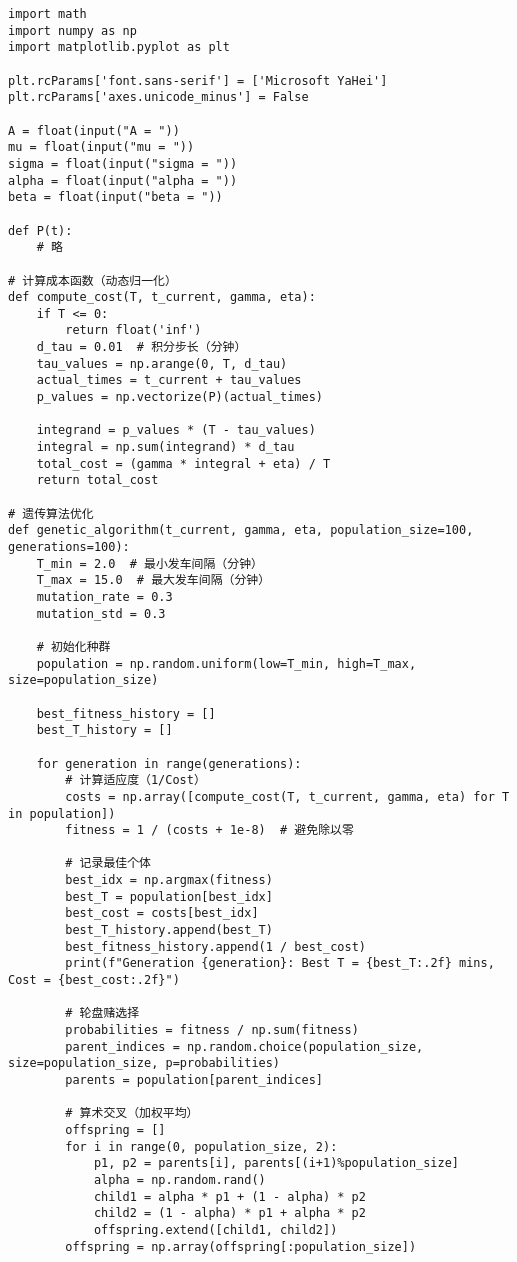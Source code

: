 \begin{lstlisting}[caption={遗传算法}]
import math
import numpy as np
import matplotlib.pyplot as plt

plt.rcParams['font.sans-serif'] = ['Microsoft YaHei']
plt.rcParams['axes.unicode_minus'] = False

A = float(input("A = "))
mu = float(input("mu = "))
sigma = float(input("sigma = "))
alpha = float(input("alpha = "))
beta = float(input("beta = "))

def P(t):
    # 略

# 计算成本函数（动态归一化）
def compute_cost(T, t_current, gamma, eta):
    if T <= 0:
        return float('inf')
    d_tau = 0.01  # 积分步长（分钟）
    tau_values = np.arange(0, T, d_tau)
    actual_times = t_current + tau_values
    p_values = np.vectorize(P)(actual_times)
    
    integrand = p_values * (T - tau_values)
    integral = np.sum(integrand) * d_tau
    total_cost = (gamma * integral + eta) / T
    return total_cost

# 遗传算法优化
def genetic_algorithm(t_current, gamma, eta, population_size=100, generations=100):
    T_min = 2.0  # 最小发车间隔（分钟）
    T_max = 15.0  # 最大发车间隔（分钟）
    mutation_rate = 0.3
    mutation_std = 0.3

    # 初始化种群
    population = np.random.uniform(low=T_min, high=T_max, size=population_size)

    best_fitness_history = []
    best_T_history = []

    for generation in range(generations):
        # 计算适应度（1/Cost）
        costs = np.array([compute_cost(T, t_current, gamma, eta) for T in population])
        fitness = 1 / (costs + 1e-8)  # 避免除以零
        
        # 记录最佳个体
        best_idx = np.argmax(fitness)
        best_T = population[best_idx]
        best_cost = costs[best_idx]
        best_T_history.append(best_T)
        best_fitness_history.append(1 / best_cost)
        print(f"Generation {generation}: Best T = {best_T:.2f} mins, Cost = {best_cost:.2f}")
        
        # 轮盘赌选择
        probabilities = fitness / np.sum(fitness)
        parent_indices = np.random.choice(population_size, size=population_size, p=probabilities)
        parents = population[parent_indices]
        
        # 算术交叉（加权平均）
        offspring = []
        for i in range(0, population_size, 2):
            p1, p2 = parents[i], parents[(i+1)%population_size]
            alpha = np.random.rand()
            child1 = alpha * p1 + (1 - alpha) * p2
            child2 = (1 - alpha) * p1 + alpha * p2
            offspring.extend([child1, child2])
        offspring = np.array(offspring[:population_size])
        

\end{lstlisting}
